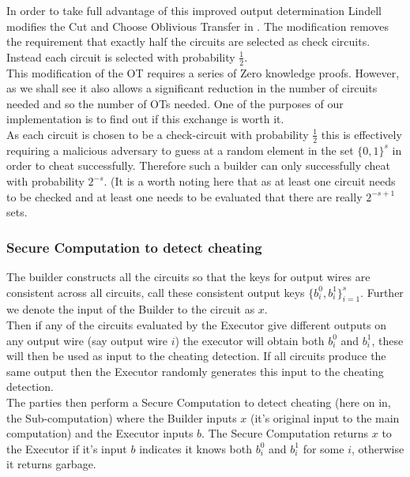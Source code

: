 \documentclass[ %
                    author={Nicholas Tutte},
                supervisor={Prof. Nigel Smart},
                    degree={MEng},
                     title={Secure Two Party Computation},
                  subtitle={A practical comparison of recent protocols},
                      type={Research - GG1K},
                      year={2015} ]{dissertation}
\begin{document}
				In order to take full advantage of this improved output determination Lindell modifies the Cut and Choose Oblivious Transfer in \cite{LindellAndPinkas2011}. The modification removes the requirement that exactly half the circuits are selected as check circuits. Instead each circuit is selected with probability $\frac{1}{2}$.\\

				This modification of the OT requires a series of Zero knowledge proofs. However, as we shall see it also allows a significant reduction in the number of circuits needed and so the number of OTs needed. One of the purposes of our implementation is to find out if this exchange is worth it.\\

				As each circuit is chosen to be a check-circuit with probability $\frac{1}{2}$ this is effectively requiring a malicious adversary to guess at a random element in the set $\{0, 1\}^s$ in order to cheat successfully. Therefore such a builder can only successfully cheat with probability $2^{-s}$. (It is a worth noting here that as at least one circuit needs to be checked and at least one needs to be evaluated that there are really $2^{-s+1}$ sets.\\

				\subsubsection{Secure Computation to detect cheating}
					The builder constructs all the circuits so that the keys for output wires are consistent across all circuits, call these consistent output keys $\{b_i^0, b_i^1\}_{i = 1}^{s}$. Further we denote the input of the Builder to the circuit as $x$.\\

					Then if any of the circuits evaluated by the Executor give different outputs on any output wire (say output wire $i$) the executor will obtain both $b_i^0$ and $b_i^1$, these will then be used as input to the cheating detection. If all circuits produce the same output then the Executor randomly generates this input to the cheating detection.\\
					
					The parties then perform a Secure Computation to detect cheating (here on in, the Sub-computation) where the Builder inputs $x$ (it's original input to the main computation) and the Executor inputs $b$. The Secure Computation returns $x$ to the Executor if it's input $b$ indicates it knows both $b_i^0$ and $b_i^1$ for some $i$, otherwise it returns garbage.\\
\end{document}
